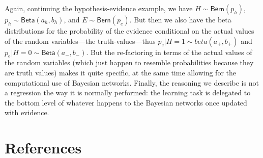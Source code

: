 \documentclass[
  10pt,
  dvipsnames,enabledeprecatedfontcommands]{scrartcl}
\begin{document}
Again, continuing the hypothesis-evidence example, we have
\(H \sim \mathsf{Bern}(p_h)\), \(p_h \sim \mathsf{Beta}(a_h, b_h)\), and
\(E\sim \mathsf{Bern}(p_e)\). But then we also have the beta
distributions for the probability of the evidence conditional on the
actual values of the random variables---the truth-values---thus
\(p_e \vert H = 1 \sim beta(a_{+}, b_{+} )\) and
\(p_e \vert H = 0 \sim \mathsf{Beta}(a_{-}, b_{-})\). But the
re-factoring in terms of the actual values of the random variables
(which just happen to resemble probabilities because they are truth
values) makes it quite specific, at the same time allowing for the
computational use of Bayesian networks. Finally, the reasoning we
describe is not a regression the way it is normally performed: the
learning task is delegated to the bottom level of whatever happens to
the Bayesian networks once updated with evidence.

\section*{References}\label{references}
\end{document}
